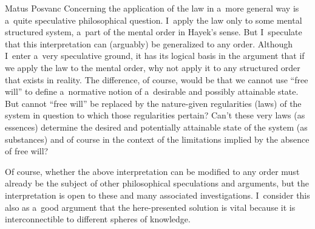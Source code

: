\begin{artengenv}{Matus Posvanc}
Concerning the application of the law in a~more general way is a~quite speculative philosophical question. I~apply the law only to some mental structured system, a~part of the mental order in Hayek's sense. But I~speculate that this interpretation can (arguably) be generalized to any order. Although I~enter a~very speculative ground, it has its logical basis in the argument that if we apply the law to the mental order, why not apply it to any structured order that exists in reality. The difference, of course, would be that we cannot use ``free will'' to define a~normative notion of a~desirable and possibly attainable state. But cannot ``free will'' be replaced by the nature-given regularities (laws) of the system in question to which those regularities pertain? Can't these very laws (as essences) determine the desired and potentially attainable state of the system (as substances) and of course in the context of the limitations implied by the absence of free will?



Of course, whether the above interpretation can be modified to any order must already be the subject of other philosophical speculations and arguments, but the interpretation is open to these and many associated investigations. I~consider this also as a~good argument that the here-presented solution is vital because it is interconnectible to different spheres of knowledge.
\enlargethispage{2.5\baselineskip}



\renewcommand{\figurename}{Figure}
\end{artengenv}

\label{posvanc-last}
